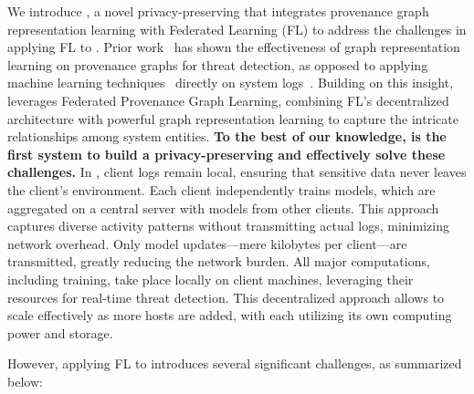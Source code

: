 \noindent
We introduce \Sys, a novel privacy-preserving \pids that integrates provenance graph representation learning with Federated Learning (FL) to address the challenges in applying FL to \pids. Prior work~\cite{wang2022threatrace} has shown the effectiveness of graph representation learning on provenance graphs for threat detection, as opposed to applying machine learning techniques~\cite{chowdhary2020natural, goodfellow2020generative} directly on system logs~\cite{deeplog2017, xia2019loggan}. Building on this insight, \Sys leverages Federated Provenance Graph Learning, combining FL’s decentralized architecture with powerful graph representation learning to capture the intricate relationships among system entities. {\bf To the best of our knowledge, \Sys is the first system to build a privacy-preserving \pids and effectively solve these challenges.} In \Sys, client logs remain local, ensuring that sensitive data never leaves the client's environment. Each client independently trains \gnnshort models, which are aggregated on a central server with models from other clients. This approach captures diverse activity patterns without transmitting actual logs, minimizing network overhead. Only model updates—mere kilobytes per client—are transmitted, greatly reducing the network burden. All major computations, including training, take place locally on client machines, leveraging their resources for real-time threat detection. This decentralized approach allows \Sys to scale effectively as more hosts are added, with each utilizing its own computing power and storage.

However, applying FL to \pids introduces several significant challenges, as summarized below:

